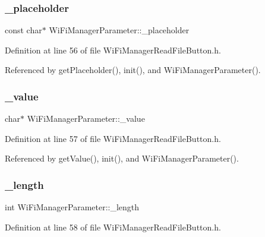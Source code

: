 \subsubsection{\texorpdfstring{\+\_\+placeholder}{\_placeholder}}
{\footnotesize\ttfamily const char$\ast$ Wi\+Fi\+Manager\+Parameter\+::\+\_\+placeholder\hspace{0.3cm}{\ttfamily [private]}}



Definition at line 56 of file Wi\+Fi\+Manager\+Read\+File\+Button.\+h.



Referenced by get\+Placeholder(), init(), and Wi\+Fi\+Manager\+Parameter().

\mbox{\label{class_wi_fi_manager_parameter_a80c6492e74603e4df46219b23580ecb6}} 
\subsubsection{\texorpdfstring{\+\_\+value}{\_value}}
{\footnotesize\ttfamily char$\ast$ Wi\+Fi\+Manager\+Parameter\+::\+\_\+value\hspace{0.3cm}{\ttfamily [private]}}



Definition at line 57 of file Wi\+Fi\+Manager\+Read\+File\+Button.\+h.



Referenced by get\+Value(), init(), and Wi\+Fi\+Manager\+Parameter().

\mbox{\label{class_wi_fi_manager_parameter_a30ca2df3654651a1b5320261a061b774}} 
\subsubsection{\texorpdfstring{\+\_\+length}{\_length}}
{\footnotesize\ttfamily int Wi\+Fi\+Manager\+Parameter\+::\+\_\+length\hspace{0.3cm}{\ttfamily [private]}}



Definition at line 58 of file Wi\+Fi\+Manager\+Read\+File\+Button.\+h.



